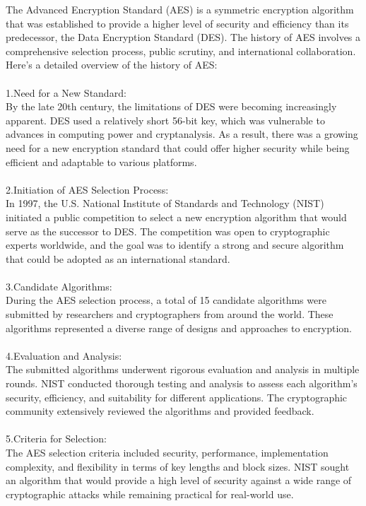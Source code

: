 \documentclass{report}
\begin{document}
The Advanced Encryption Standard (AES) is a symmetric encryption algorithm that was established to provide a higher level of security and efficiency than its predecessor, the Data Encryption Standard (DES). The history of AES involves a comprehensive selection process, public scrutiny, and international collaboration. Here's a detailed overview of the history of AES:\\
\\
1.Need for a New Standard:\\
By the late 20th century, the limitations of DES were becoming increasingly apparent. DES used a relatively short 56-bit key, which was vulnerable to advances in computing power and cryptanalysis. As a result, there was a growing need for a new encryption standard that could offer higher security while being efficient and adaptable to various platforms.\\
\\
2.Initiation of AES Selection Process:\\
In 1997, the U.S. National Institute of Standards and Technology (NIST) initiated a public competition to select a new encryption algorithm that would serve as the successor to DES. The competition was open to cryptographic experts worldwide, and the goal was to identify a strong and secure algorithm that could be adopted as an international standard.\\
\\
3.Candidate Algorithms:\\
During the AES selection process, a total of 15 candidate algorithms were submitted by researchers and cryptographers from around the world. These algorithms represented a diverse range of designs and approaches to encryption.\\
\\
4.Evaluation and Analysis:\\
The submitted algorithms underwent rigorous evaluation and analysis in multiple rounds. NIST conducted thorough testing and analysis to assess each algorithm's security, efficiency, and suitability for different applications. The cryptographic community extensively reviewed the algorithms and provided feedback.\\
\\
5.Criteria for Selection:\\
The AES selection criteria included security, performance, implementation complexity, and flexibility in terms of key lengths and block sizes. NIST sought an algorithm that would provide a high level of security against a wide range of cryptographic attacks while remaining practical for real-world use.\\
\end{document}
